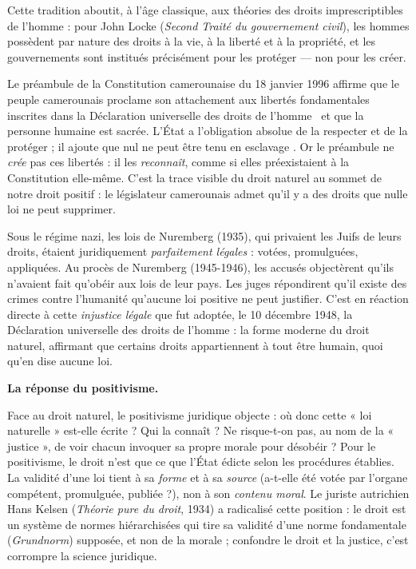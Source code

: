 \documentclass[11pt]{article}
\newcommand{\cle}[1]{{\popxbold\color{popdark}#1}}
\newcounter{popsec}
\newcounter{popsub}
\newcommand{\courssub}[1]{%
  \stepcounter{popsub}%
  \par\vspace{9pt}\noindent{\popxbold\fontsize{11.5}{13}\selectfont\color{popink}{\color{poporange}\thepopsec.\thepopsub}\hspace{6pt}#1}\par\nopagebreak\vspace{4pt}
}
\begin{document}
Cette tradition aboutit, à l'âge classique, aux théories des droits imprescriptibles de l'homme : pour John Locke (\emph{Second Traité du gouvernement civil}), les hommes possèdent par nature des droits à la vie, à la liberté et à la propriété, et les gouvernements sont institués précisément pour les protéger — non pour les créer.

\begin{exemplebox}
Le préambule de la Constitution camerounaise du 18 janvier 1996 affirme que \guillemotleft le peuple camerounais proclame son attachement aux libertés fondamentales inscrites dans la Déclaration universelle des droits de l'homme \guillemotright\ et que \guillemotleft la personne humaine est sacrée. L'État a l'obligation absolue de la respecter et de la protéger \guillemotright ; il ajoute que \guillemotleft nul ne peut être tenu en esclavage \guillemotright. Or le préambule ne \emph{crée} pas ces libertés : il les \emph{reconnaît}, comme si elles préexistaient à la Constitution elle-même. C'est la trace visible du droit naturel au sommet de notre droit positif : le législateur camerounais admet qu'il y a des droits que nulle loi ne peut supprimer.
\end{exemplebox}

\begin{savaistu}
Sous le régime nazi, les lois de Nuremberg (1935), qui privaient les Juifs de leurs droits, étaient juridiquement \emph{parfaitement légales} : votées, promulguées, appliquées. Au procès de Nuremberg (1945-1946), les accusés objectèrent qu'ils n'avaient fait qu'obéir aux lois de leur pays. Les juges répondirent qu'il existe des crimes contre l'humanité qu'aucune loi positive ne peut justifier. C'est en réaction directe à cette \emph{injustice légale} que fut adoptée, le 10 décembre 1948, la Déclaration universelle des droits de l'homme : la forme moderne du droit naturel, affirmant que certains droits appartiennent à tout être humain, quoi qu'en dise aucune loi.
\end{savaistu}

\courssub{Le droit positif : le droit comme fait institutionnel}

\textbf{La réponse du positivisme.}\par

Face au droit naturel, le \cle{positivisme juridique} objecte : où donc cette « loi naturelle » est-elle écrite ? Qui la connaît ? Ne risque-t-on pas, au nom de la « justice », de voir chacun invoquer sa propre morale pour désobéir ? Pour le positivisme, le droit n'est que ce que l'État édicte selon les procédures établies. La validité d'une loi tient à sa \emph{forme} et à sa \emph{source} (a-t-elle été votée par l'organe compétent, promulguée, publiée ?), non à son \emph{contenu moral}. Le juriste autrichien Hans Kelsen (\emph{Théorie pure du droit}, 1934) a radicalisé cette position : le droit est un système de normes hiérarchisées qui tire sa validité d'une norme fondamentale (\emph{Grundnorm}) supposée, et non de la morale ; confondre le droit et la justice, c'est corrompre la science juridique.
\end{document}
